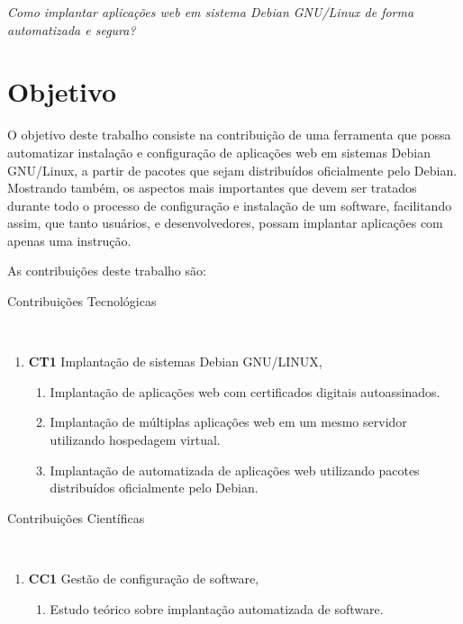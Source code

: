 \begin{center}
  \textit{
  Como implantar aplicações web em sistema Debian GNU/Linux de forma automatizada
  e segura?
}
\end{center}

\section{Objetivo}

O objetivo deste trabalho consiste na contribuição de uma ferramenta
que possa automatizar instalação e configuração de aplicações web em sistemas
Debian GNU/Linux, a partir de pacotes que sejam distribuídos oficialmente pelo
Debian. Mostrando também, os aspectos mais importantes que devem ser tratados durante
todo o processo de configuração e instalação de um software, facilitando assim, que
tanto usuários, e desenvolvedores, possam implantar aplicações com apenas uma
instrução.

As contribuições deste trabalho são:

\begin{description}
  \item [Contribuições Tecnológicas]\
\end{description}
    \begin{enumerate}
      \item \textbf{CT1} Implantação de sistemas Debian GNU/LINUX,
        \begin{enumerate}
          \item Implantação de aplicações web com certificados digitais autoassinados.
          \item Implantação de múltiplas aplicações web em um mesmo servidor utilizando
          hospedagem virtual.
          \item Implantação de automatizada de aplicações web utilizando pacotes
          distribuídos oficialmente pelo Debian.
        \end{enumerate}
    \end{enumerate}

\begin{description}
  \item [Contribuições Científicas]\
\end{description}
    \begin{enumerate}
      \item \textbf{CC1} Gestão de configuração de software,
        \begin{enumerate}
          \item Estudo teórico sobre implantação automatizada de software.
        \end{enumerate}
    \end{enumerate}


